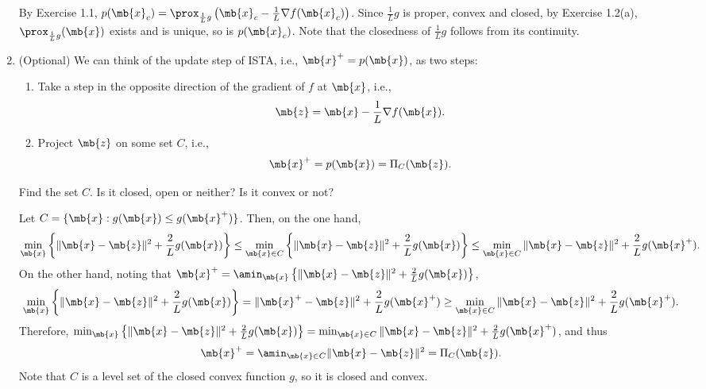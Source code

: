 \begin{exercise}
\begin{enumerate}[resume]
            \begin{solution}
                By Exercise 1.1, $p(\mb{x}_c)=\prox_{\frac{1}{L}g}\left(\mb{x}_c-\frac{1}{L}\nabla f(\mb{x}_c)\right)$. Since $\frac{1}{L}g$ is proper, convex and closed, by Exercise 1.2(a), $\prox_{\frac{1}{L}g}(\mb{x})$ exists and is unique, so is $p(\mb{x}_c)$. Note that the closedness of $\frac{1}{L}g$ follows from its continuity.
            \end{solution}
        \item (Optional) We can think of the update step of ISTA, i.e.,  $\mb{x}^+=p(\mb{x})$, as two steps:
            \begin{enumerate}
                \item Take a step in the opposite direction of the gradient of $f$ at $\mb{x}$, i.e.,
                    \begin{align*}
                        \mb{z}=\mb{x}-\frac{1}{L}\nabla f(\mb{x}).
                    \end{align*}

                \item Project $\mb{z}$ on some set $C$, i.e.,
                    \begin{align*}
                        \mb{x}^+=p(\mb{x})=\Pi_C(\mb{z}).
                    \end{align*}

            \end{enumerate}
            Find the set $C$. Is it closed, open or neither? Is it convex or not?

            \begin{solution}
                Let $C = \{\mb{x}: g(\mb{x})\le g(\mb{x}^+)\}$. Then, on the one hand,
                \begin{align*}
                    \min_{\mb{x}}\left\{\|\mb{x}-\mb{z}\|^2+\frac{2}{L}g(\mb{x})\right\} \le \min_{\mb{x}\in C}\left\{\|\mb{x}-\mb{z}\|^2+\frac{2}{L}g(\mb{x})\right\}\le\min_{\mb{x}\in C}\|\mb{x}-\mb{z}\|^2+\frac{2}{L}g(\mb{x}^+).
                \end{align*}
                On the other hand, noting that $\mb{x}^+ = \amin_{\mb{x}}\left\{\|\mb{x}-\mb{z}\|^2+\frac{2}{L}g(\mb{x})\right\}$,
                \begin{align*}
                    \min_{\mb{x}}\left\{\|\mb{x}-\mb{z}\|^2+\frac{2}{L}g(\mb{x})\right\} = \|\mb{x}^+-\mb{z}\|^2+\frac{2}{L}g(\mb{x}^+) \ge \min_{\mb{x}\in C}\|\mb{x}-\mb{z}\|^2+\frac{2}{L}g(\mb{x}^+).
                \end{align*}
                Therefore, $\min_{\mb{x}}\left\{\|\mb{x}-\mb{z}\|^2+\frac{2}{L}g(\mb{x})\right\} = \min_{\mb{x}\in C}\|\mb{x}-\mb{z}\|^2+\frac{2}{L}g(\mb{x}^+)$, and thus
                \begin{align*}
                    \mb{x}^+ = \amin_{\mb{x}\in C}\|\mb{x}-\mb{z}\|^2 = \Pi_C(\mb{z}).
                \end{align*}
                Note that $C$ is a level set of the closed convex function $g$, so it is closed and convex.\qedhere


\end{solution}
\end{enumerate}
\end{exercise}
